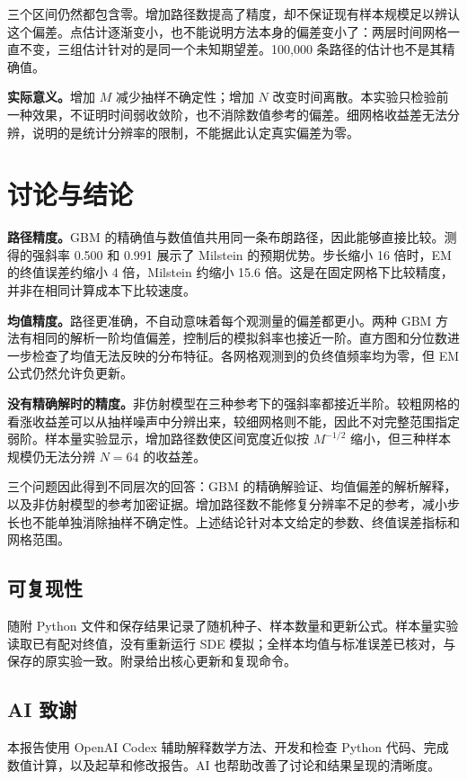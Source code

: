 \documentclass[11pt,a4paper,fontset=none]{ctexart}
\begin{document}
三个区间仍然都包含零。增加路径数提高了精度，却不保证现有样本规模足以辨认这个偏差。点估计逐渐变小，也不能说明方法本身的偏差变小了：两层时间网格一直不变，三组估计针对的是同一个未知期望差。100,000 条路径的估计也不是其精确值。

\textbf{实际意义。}增加 $M$ 减少抽样不确定性；增加 $N$ 改变时间离散。本实验只检验前一种效果，不证明时间弱收敛阶，也不消除数值参考的偏差。细网格收益差无法分辨，说明的是统计分辨率的限制，不能据此认定真实偏差为零。

\newpage
\section{讨论与结论}
\textbf{路径精度。}GBM 的精确值与数值值共用同一条布朗路径，因此能够直接比较。测得的强斜率 0.500 和 0.991 展示了 Milstein 的预期优势。步长缩小 16 倍时，EM 的终值误差约缩小 4 倍，Milstein 约缩小 15.6 倍。这是在固定网格下比较精度，并非在相同计算成本下比较速度。

\textbf{均值精度。}路径更准确，不自动意味着每个观测量的偏差都更小。两种 GBM 方法有相同的解析一阶均值偏差，控制后的模拟斜率也接近一阶。直方图和分位数进一步检查了均值无法反映的分布特征。各网格观测到的负终值频率均为零，但 EM 公式仍然允许负更新。

\textbf{没有精确解时的精度。}非仿射模型在三种参考下的强斜率都接近半阶。较粗网格的看涨收益差可以从抽样噪声中分辨出来，较细网格则不能，因此不对完整范围指定弱阶。样本量实验显示，增加路径数使区间宽度近似按 $M^{-1/2}$ 缩小，但三种样本规模仍无法分辨 $N=64$ 的收益差。

三个问题因此得到不同层次的回答：GBM 的精确解验证、均值偏差的解析解释，以及非仿射模型的参考加密证据。增加路径数不能修复分辨率不足的参考，减小步长也不能单独消除抽样不确定性。上述结论针对本文给定的参数、终值误差指标和网格范围。

\subsection*{可复现性}
随附 Python 文件和保存结果记录了随机种子、样本数量和更新公式。样本量实验读取已有配对终值，没有重新运行 SDE 模拟；全样本均值与标准误差已核对，与保存的原实验一致。附录给出核心更新和复现命令。

\subsection*{AI 致谢}
本报告使用 OpenAI Codex 辅助解释数学方法、开发和检查 Python 代码、完成数值计算，以及起草和修改报告。AI 也帮助改善了讨论和结果呈现的清晰度。
\end{document}
